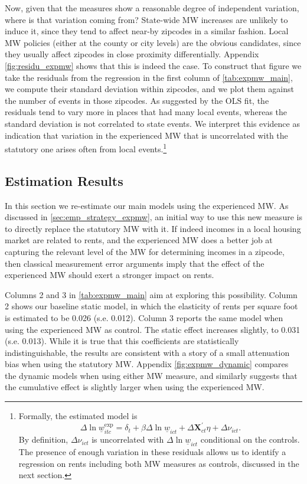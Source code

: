 Now, given that the measures show a reasonable degree of independent variation, where is that
variation coming from? State-wide MW increases are unlikely to induce it, since they tend to 
affect near-by zipcodes in a similar fashion. Local MW policies (either at the county or city
levels) are the obvious candidates, since they usually affect zipcodes in close proximity 
differentially. Appendix \autoref{fig:residu_expmw} shows that this is indeed the case. To 
construct that figure we take the residuals from the regression in the first column of 
\autoref{tab:expmw_main}, we compute their standard deviation within zipcodes, and we plot 
them against the number of events in those zipcodes. As suggested by the OLS fit, the residuals
tend to vary more in places that had many local events, whereas the standard deviation is not 
correlated to state events. We interpret this evidence as indication that variation in the 
experienced MW that is uncorrelated with the statutory one arises often from local 
events.\footnote{Formally, the estimated model is 
	$$ \Delta \ln \underline{w}_{itc}^{\text{exp}} = \delta_t 
				+ \beta \Delta \ln \underline{w}_{ict} + \Delta \mathbf{X}^{'}_{ct} \eta 
				+ \Delta \nu_{ict} . $$
	By definition, $\Delta \nu_{ict}$ is uncorrelated with $\Delta \ln \underline{w}_{ict}$ 
	conditional on the controls. The presence of enough variation in these residuals allows us
	to identify a regression on rents including both MW measures as controls, discussed in the
	next section.}


\subsection{Estimation Results}

In this section we re-estimate our main models using the experienced MW. As discussed in 
\autoref{sec:emp_strategy_expmw}, an initial way to use this new measure is to directly
replace the statutory MW with it. If indeed incomes in a local housing market are related
to rents, and the experienced MW does a better job at capturing the relevant level of the 
MW for determining incomes in a zipcode, then classical measurement error arguments imply 
that the effect of the experienced MW should exert a stronger impact on rents. 

Columns 2 and 3 in \autoref{tab:expmw_main} aim at exploring this possibility. Column 2 
shows our baseline static model, in which the elasticity of rents per square foot is 
estimated to be 0.026 (s.e. 0.012). Column 3 reports the same model when using the 
experienced MW as control. The static effect increases slightly, to 0.031 (s.e. 0.013).
While it is true that this coefficients are statistically indistinguishable, the results
are consistent with a story of a small attenuation bias when using the statutory MW. 
Appendix \autoref{fig:expmw_dynamic} compares the dynamic models when using either MW 
measure, and similarly suggests that the cumulative effect is slightly larger when using
the experienced MW.

